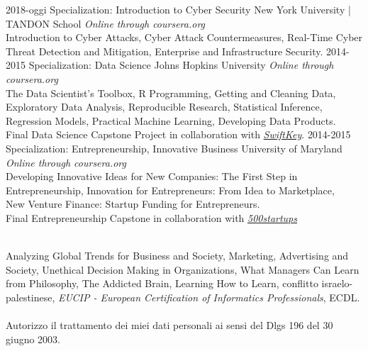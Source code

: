\documentclass[]{friggeri-cv}
\begin{document}
\begin{entrylist}
\entry
    {2018-oggi}
    {Specialization: Introduction to Cyber Security}
    {New York University | TANDON School}
    {\emph{Online through coursera.org}\\
    Introduction to Cyber Attacks, Cyber Attack Countermeasures, Real-Time Cyber Threat Detection and Mitigation, Enterprise and Infrastructure Security.
    }
\entry
    {2014-2015}
    {Specialization: Data Science}
    {Johns Hopkins University}
    {\emph{Online through coursera.org}\\
    The Data Scientist’s Toolbox, R Programming, Getting and Cleaning Data, \\Exploratory Data Analysis, Reproducible Research, Statistical Inference, \\Regression Models, Practical Machine Learning, Developing Data Products.\\
    Final Data Science Capstone Project in collaboration with \emph{\href{http://swiftkey.com/it/}{SwiftKey}}.
    }
\entry
    {2014-2015}
    {Specialization: Entrepreneurship, Innovative Business}
    {University of Maryland}
    {\emph{Online through coursera.org}\\
    Developing Innovative Ideas for New Companies: The First Step in\\ Entrepreneurship, Innovation for Entrepreneurs: From Idea to Marketplace,\\ New Venture Finance: Startup Funding for Entrepreneurs. \\
    Final Entrepreneurship Capstone in collaboration with \emph{\href{http://500.co/startups}{500startups}}
    }
\end{entrylist}\\

Analyzing Global Trends for Business and Society, Marketing, Advertising and Society, Unethical Decision Making in Organizations, What Managers Can Learn from Philosophy, The Addicted Brain, Learning How to Learn, conflitto israelo-palestinese, \emph{EUCIP - European Certification of Informatics Professionals}, ECDL.
\\ \\
Autorizzo il trattamento dei miei dati personali ai sensi del Dlgs 196 del 30 giugno 2003.
\end{document}
